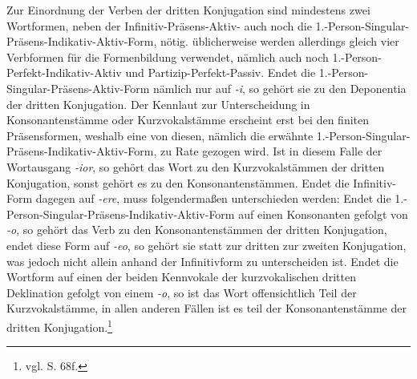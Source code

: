 Zur Einordnung der Verben der dritten Konjugation sind mindestens zwei Wortformen, neben der Infinitiv-Präsens-Aktiv- auch noch die 1.-Person-Singular-Präsens-Indikativ-Aktiv-Form, nötig. üblicherweise werden allerdings gleich vier Verbformen für die Formenbildung verwendet, nämlich auch noch 1.-Person-Perfekt-Indikativ-Aktiv und Partizip-Perfekt-Passiv. Endet die 1.-Person-Singular-Präsens-Aktiv-Form nämlich nur auf \textit{-i}, so gehört sie zu den Deponentia der dritten Konjugation. Der Kennlaut zur Unterscheidung in Konsonantenstämme oder Kurzvokalstämme erscheint erst bei den finiten Präsensformen, weshalb eine von diesen, nämlich die erwähnte 1.-Person-Singular-Präsens-Indikativ-Aktiv-Form, zu Rate gezogen wird. Ist in diesem Falle der Wortausgang \textit{-ior}, so gehört das Wort zu den Kurzvokalstämmen der dritten Konjugation, sonst gehört es zu den Konsonantenstämmen. Endet die Infinitiv-Form dagegen auf \textit{-ere}, muss folgendermaßen unterschieden werden: Endet die 1.-Person-Singular-Präsens-Indikativ-Aktiv-Form auf einen Konsonanten gefolgt von \textit{-o}, so gehört das Verb zu den Konsonantenstämmen der dritten Konjugation, endet diese Form auf \textit{-eo}, so gehört sie statt zur dritten zur zweiten Konjugation, was jedoch nicht allein anhand der Infinitivform zu unterscheiden ist. Endet die Wortform auf einen der beiden Kennvokale der kurzvokalischen dritten Deklination gefolgt von einem \textit{-o}, so ist das Wort offensichtlich Teil der Kurzvokalstämme, in allen anderen Fällen ist es teil der Konsonantenstämme der dritten Konjugation.\footnote{vgl. \cite{BAYER-LINDAUER1994} S. 68f.} \par
\FloatBarrier
